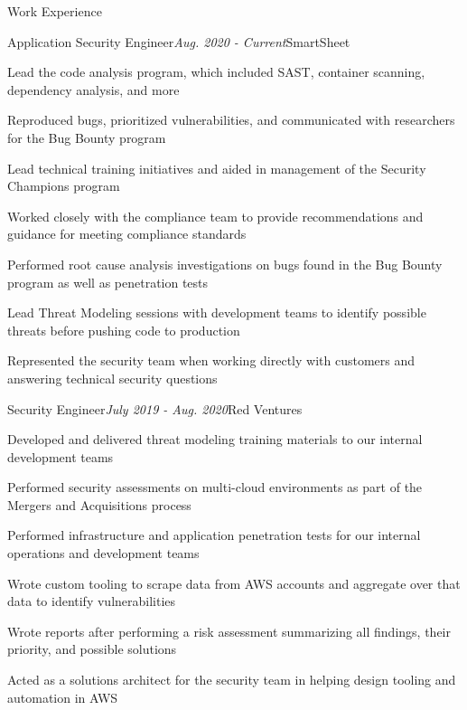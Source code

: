 \documentclass{resume} %
\begin{document}
\begin{rSection}{\vspace{-5pt}Work Experience}

  \begin{rSubsection}{Application Security Engineer}{\em Aug. 2020 - Current}{SmartSheet}{}
  \item {Lead the code analysis program, which included SAST, container scanning, dependency analysis, and more}
  \item {Reproduced bugs, prioritized vulnerabilities, and communicated with researchers for the Bug Bounty program}
  \item {Lead technical training initiatives and aided in management of the Security Champions program}
  \item {Worked closely with the compliance team to provide recommendations and guidance for meeting compliance standards}
  \item {Performed root cause analysis investigations on bugs found in the Bug Bounty program as well as penetration tests}
  \item {Lead Threat Modeling sessions with development teams to identify possible threats before pushing code to production}
  \item {Represented the security team when working directly with customers and answering technical security questions}

  \end{rSubsection}



  \begin{rSubsection}{Security Engineer}{\em July 2019 - Aug. 2020}{Red Ventures}{}
  \item {Developed and delivered threat modeling training materials to our internal development teams}
  \item {Performed security assessments on multi-cloud environments as part of the Mergers and Acquisitions process}
  \item {Performed infrastructure and application penetration tests for our internal operations and development teams}
  \item {Wrote custom tooling to scrape data from AWS accounts and aggregate over that data to identify vulnerabilities}
  \item {Wrote reports after performing a risk assessment summarizing all findings, their priority, and possible solutions}
  \item {Acted as a solutions architect for the security team in helping design tooling and automation in AWS}


\end{rSubsection}
\end{rSection}
\end{document}
